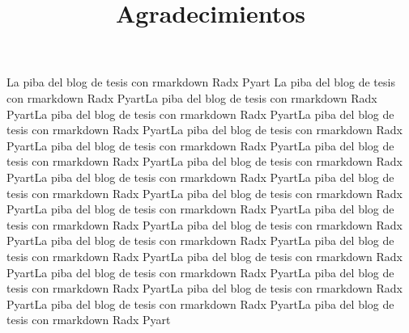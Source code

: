 \documentclass[12pt,spanish,oneside]{book}
\title{Agradecimientos}
\author{}
\date{}
\begin{document}
\maketitle

{
\setcounter{tocdepth}{3}
\tableofcontents
}
La piba del blog de tesis con rmarkdown Radx Pyart La piba del blog de
tesis con rmarkdown Radx PyartLa piba del blog de tesis con rmarkdown
Radx PyartLa piba del blog de tesis con rmarkdown Radx PyartLa piba del
blog de tesis con rmarkdown Radx PyartLa piba del blog de tesis con
rmarkdown Radx PyartLa piba del blog de tesis con rmarkdown Radx PyartLa
piba del blog de tesis con rmarkdown Radx PyartLa piba del blog de tesis
con rmarkdown Radx PyartLa piba del blog de tesis con rmarkdown Radx
PyartLa piba del blog de tesis con rmarkdown Radx PyartLa piba del blog
de tesis con rmarkdown Radx PyartLa piba del blog de tesis con rmarkdown
Radx PyartLa piba del blog de tesis con rmarkdown Radx PyartLa piba del
blog de tesis con rmarkdown Radx PyartLa piba del blog de tesis con
rmarkdown Radx PyartLa piba del blog de tesis con rmarkdown Radx PyartLa
piba del blog de tesis con rmarkdown Radx PyartLa piba del blog de tesis
con rmarkdown Radx PyartLa piba del blog de tesis con rmarkdown Radx
PyartLa piba del blog de tesis con rmarkdown Radx PyartLa piba del blog
de tesis con rmarkdown Radx PyartLa piba del blog de tesis con rmarkdown
Radx Pyart
\end{document}
